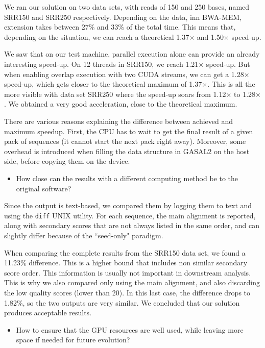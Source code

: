 We ran our solution on two data sets, with reads of 150 and 250 bases, named SRR150 and SRR250 respectively. Depending on the data, inn BWA-MEM, extension takes between 27\% and 33\% of the total time. This means that, depending on the situation, we can reach a theoretical 1.37$\times$ and 1.50$\times$ speed-up.

We saw that on our test machine, parallel execution alone can provide an already interesting speed-up. On 12 threads in SRR150, we reach 1.21$\times$ speed-up. But when enabling overlap execution with two CUDA streams, we can get a 1.28$\times$ speed-up, which gets closer to the theoretical maximum of 1.37$\times$. This is all the more visible with data set SRR250 where the speed-up soars from 1.12$\times$ to 1.28$\times$. We obtained a very good acceleration, close to the theoretical maximum. 

There are various reasons explaining the difference between achieved and maximum speedup. First, the CPU has to wait to get the final result of a given pack of sequences (it cannot start the next pack right away). Moreover, some overhead is introduced when filling the data structure in GASAL2 on the host side, before copying them on the device.

\begin{itemize}
	\item How close can the results with a different computing method be to the original software?
\end{itemize}

Since the output is text-based, we compared them by logging them to text and using the \verb|diff| UNIX utility. For each sequence, the main alignment is reported, along with secondary scores that are not always listed in the same order, and can slightly differ because of the ``seed-only" paradigm.

When comparing the complete results from the SRR150 data set, we found a 11.23\% difference. This is a higher bound that includes non similar secondary score order. This information is usually not important in downstream analysis. This is why we also compared only using the main alignment, and also discarding the low quality scores (lower than 20). In this last case, the difference drops to 1.82\%, so the two outputs are very similar. We concluded that our solution produces acceptable results.

\begin{itemize}
	\item How to ensure that the GPU resources are well used, while leaving more space if needed for future evolution?
\end{itemize}

